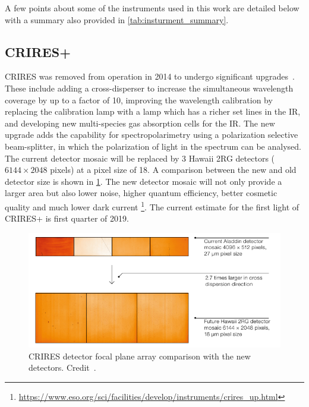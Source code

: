 A few points about some of the \nir{} instruments used in this work are detailed below with a summary also provided in \cref{tab:insturment_summary}.



\subsection{CRIRES+}
\label{subsec:criresplus}
CRIRES was removed from operation in 2014 to undergo significant upgrades~\citep{dorn_crires_2014}.
These include adding a cross-disperser to increase the simultaneous wavelength coverage by up to a factor of 10, improving the wavelength calibration by replacing the \thar{} calibration lamp with a \une{} lamp which has a richer set lines in the IR, and developing new multi-species gas absorption cells for the {IR}.
The new upgrade adds the capability for spectropolarimetry using a polarization selective beam-splitter, in which the polarization of light in the spectrum can be analysed.
The current detector mosaic will be replaced by 3 Hawaii 2RG detectors (\(6144\times 2048\) pixels) at a pixel size of 18\um{}.
A comparison between the new and old detector size is shown in \cref{fig:criresplus_detecotrs}.
The new detector mosaic will not only provide a larger area but also lower noise, higher quantum efficiency, better cosmetic quality and much lower dark current
\footnote{\href{https://www.eso.org/sci/facilities/develop/instruments/crires_up.html}{https://www.eso.org/sci/facilities/develop/instruments/crires\_up.html}}.
The current estimate for the first light of CRIRES+ is first quarter of 2019.

\begin{figure}
    \centering
    \includegraphics[width=0.6\linewidth]{figures/spectroscopy/criresplus_detectors.pdf}
    \caption{CRIRES detector focal plane array comparison with the new detectors.
    Credit~\citet{dorn_crires_2014}.}
    \label{fig:criresplus_detecotrs}
\end{figure}

